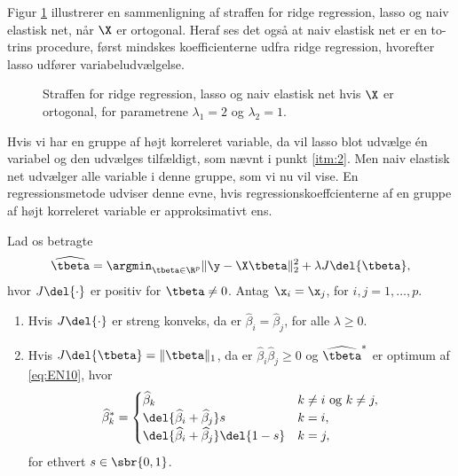 %
Figur \ref{fig:elastisk2} illustrerer en sammenligning af straffen for ridge regression, lasso og naiv elastisk net, når \(\X\) er ortogonal.
Heraf ses det også at naiv elastisk net er en to-trins procedure, først mindskes koefficienterne udfra ridge regression, hvorefter lasso udfører variabeludvælgelse. 
%
\begin{figure}[H]
\centering
\scalebox{0.8}{}
\caption{Straffen for ridge regression, lasso og naiv elastisk net hvis \(\X\) er ortogonal, for  parametrene \(\lambda_1=2\) og \(\lambda_2=1\).} \label{fig:elastisk2}
\end{figure}
Hvis vi har en gruppe af højt korreleret variable, da vil lasso blot udvælge én variabel og den udvælges tilfældigt, som nævnt i punkt \ref{itm:2}.
Men naiv elastisk net udvælger alle variable i denne gruppe, som vi nu vil vise. 
En regressionsmetode udviser denne evne, hvis regressionskoeffcienterne af en gruppe af højt korreleret variable er approksimativt ens.
%
\begin{lem} \label{lem:elastisk_net2}
Lad os betragte
\begin{align}
\widehat{\tbeta} = \argmin_{\tbeta \in \R^p} \Vert \y - \X \tbeta \Vert_2^2 + \lambda J \del{\tbeta}, \label{eq:EN10}
\end{align}
hvor \(J \del{\cdot}\) er positiv for \(\tbeta \neq 0\).
Antag \(\x_i = \x_j\), for \(i, j = 1, \ldots, p\).
\begin{enumerate}[label=\alph*)]
\item Hvis \(J \del{\cdot}\) er streng konveks, da er \(\widehat{\beta}_i = \widehat{\beta}_j\), for alle \(\lambda \geq 0\).
\item Hvis \(J \del{\tbeta} = \Vert \tbeta \Vert_1\), da er \(\widehat{\beta}_i \widehat{\beta}_j \geq 0\) og \(\widehat{\tbeta}^*\) er optimum af \eqref{eq:EN10}, hvor
\begin{align*}
\widehat{\beta}_k^* = \begin{cases}
\widehat{\beta}_k & k \neq i \text{ og } k \neq j, \\
\del{\widehat{\beta}_i + \widehat{\beta}_j} s & k = i, \\
\del{\widehat{\beta}_i + \widehat{\beta}_j} \del{1-s} & k = j,
\end{cases}
\end{align*}
for ethvert \(s \in \sbr{0,1}\).
\end{enumerate}
\end{lem}
